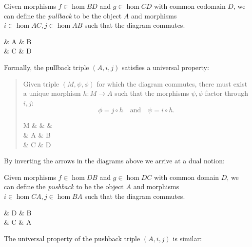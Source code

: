 \documentclass[11pt]{article}
\theoremstyle{definition}
\begin{document}
\begin{multicols}{2}
  Given morphisms $f\in\hom{B}{D}$ and $g\in\hom{C}{D}$ with common codomain $D$, we can define the \textit{pullback} to be the object $A$ and morphisms $i\in\hom{A}{C},j\in\hom{A}{B}$ such that the diagram commutes.
  \columnbreak
  \begin{cd}
    \& A \ar[r, "i"] \ar[d, "j"] \& B \ar[d, "f"] \\ 
    \& C \ar[r, "g"]             \& D
  \end{cd}
\end{multicols}
Formally, the pullback triple $(A, i, j)$ satisfies a universal property:

\begin{multicols}{2}
  \begin{quotation}
    Given triple $(M, \psi, \phi)$ for which the diagram commutes, there must exist a unique morphism $h: M\to A$ such that the morphisms $\psi,\phi$ factor through $i,j$:
    \vspace*{-0.1cm}
    \[ \phi=j\circ h \quad\text{and}\quad \psi=i\circ h. \]
    \columnbreak
    \vspace*{-1.8cm}
    \begin{cd}
      M \ar[rrd, bend left=15, "\psi"]  \ar[rdd, bend right=15, "\phi"'] 
      \& \& \& \\
      \& A \ar[r, "i"] \ar[d, "j"]  \& B \ar[d, "f"] \\ 
      \& C \ar[r, "g"]                 \& D
    \end{cd}
  \end{quotation}
\end{multicols}

By inverting the arrows in the diagrams above we arrive at a dual notion:

\begin{multicols}{2}
  Given morphisms $f\in\hom{D}{B}$ and $g\in\hom{D}{C}$ with common domain $D$, we can define the \textit{pushback} to be the object $A$ and morphisms $i\in\hom{C}{A},j\in\hom{B}{A}$ such that the diagram commutes.
  \columnbreak
  \begin{cd}
    \& D \ar[r, "f"] \ar[d, "g"] \& B \ar[d, "i"] \\ 
    \& C \ar[r, "j"]             \& A
  \end{cd}
\end{multicols}
The universal property of the pushback triple $(A, i, j)$ is similar:
\end{document}
